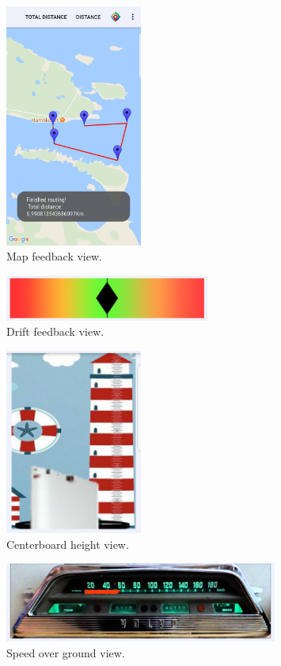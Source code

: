 \begin{figure}[H]
\centering
\includegraphics[width=0.4\textwidth]{Figures/map.png}
\caption{Map feedback view.}
\label{feedback-map}
\end{figure}
\begin{figure}[H]
\centering
\includegraphics[width=0.6\textwidth]{Figures/drift.png}
\caption{Drift feedback view.}
\label{feedback-drift}
\end{figure}
\begin{figure}[H]
\centering
\includegraphics[width=0.4\textwidth]{Figures/height.png}
\caption{Centerboard height view.}
\label{feedback-height}
\end{figure}
\begin{figure}[H]
\centering
\includegraphics[width=0.8\textwidth]{Figures/sog.jpg}
\caption{Speed over ground view.}
\label{feedback-sog}
\end{figure}

